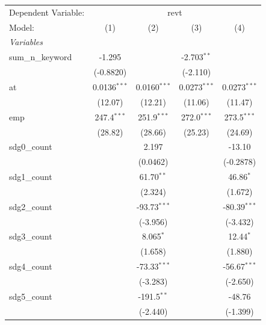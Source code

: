 
\begingroup
\centering
\begin{tabular}{lcccc}
   \tabularnewline \midrule \midrule
   Dependent Variable: & \multicolumn{4}{c}{revt}\\
   Model:            & (1)            & (2)            & (3)            & (4)\\  
   \midrule
   \emph{Variables}\\
   sum\_n\_keyword   & -1.295         &                & -2.703$^{**}$  &   \\   
                     & (-0.8820)      &                & (-2.110)       &   \\   
   at                & 0.0136$^{***}$ & 0.0160$^{***}$ & 0.0273$^{***}$ & 0.0273$^{***}$\\   
                     & (12.07)        & (12.21)        & (11.06)        & (11.47)\\   
   emp               & 247.4$^{***}$  & 251.9$^{***}$  & 272.0$^{***}$  & 273.5$^{***}$\\   
                     & (28.82)        & (28.66)        & (25.23)        & (24.69)\\   
   sdg0\_count       &                & 2.197          &                & -13.10\\   
                     &                & (0.0462)       &                & (-0.2878)\\   
   sdg1\_count       &                & 61.70$^{**}$   &                & 46.86$^{*}$\\   
                     &                & (2.324)        &                & (1.672)\\   
   sdg2\_count       &                & -93.73$^{***}$ &                & -80.39$^{***}$\\   
                     &                & (-3.956)       &                & (-3.432)\\   
   sdg3\_count       &                & 8.065$^{*}$    &                & 12.44$^{*}$\\   
                     &                & (1.658)        &                & (1.880)\\   
   sdg4\_count       &                & -73.33$^{***}$ &                & -56.67$^{***}$\\   
                     &                & (-3.283)       &                & (-2.650)\\   
   sdg5\_count       &                & -191.5$^{**}$  &                & -48.76\\   
                     &                & (-2.440)       &                & (-1.399)\\   

\end{tabular}
